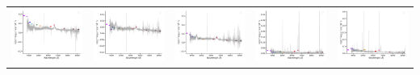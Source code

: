 \begin{center}
\begin{longtable}{l l l l l }
    \includegraphics[width=0.19\linewidth, clip]{Figs/Figs-sdss/spec-0702-52178-0098-STRIPE82-0047-013896.pdf} & \includegraphics[width=0.19\linewidth, clip]{Figs/Figs-sdss/spec-0702-52178-0126-STRIPE82-0047-015137.pdf} & \includegraphics[width=0.19\linewidth, clip]{Figs/Figs-sdss/spec-0703-52209-0097-STRIPE82-0049-015869.pdf} & \includegraphics[width=0.19\linewidth, clip]{Figs/Figs-sdss/spec-0705-52200-0577-STRIPE82-0056-038958.pdf} & \includegraphics[width=0.19\linewidth, clip]{Figs/Figs-sdss/spec-0707-52177-0374-STRIPE82-0060-019709.pdf} \\

\end{longtable}
\end{center}
